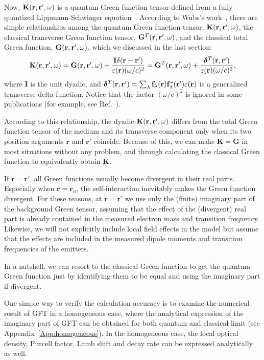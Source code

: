 Now, $\mathbf{K}(\mathbf{r},\mathbf{r}',\omega)$ is a quantum Green function tensor defined from a fully quantized Lippmann-Schwinger equation~\cite{Wubs2004}.
According to Wubs's work~\cite{Wubs2004}, there are simple relationships among the quantum Green function tensor, $\mathbf{K}(\mathbf{r},\mathbf{r}',\omega)$, the classical transverse Green function tensor, $\mathbf{G}^T(\mathbf{r},\mathbf{r}',\omega)$, and the classical total Green function, $\mathbf{G}(\mathbf{r},\mathbf{r}',\omega)$, which we discussed in the last section:
\begin{equation}
 \label{KG}
 \mathbf{K}(\mathbf{r},\mathbf{r}',\omega)=\mathbf{G}(\mathbf{r},\mathbf{r}',\omega)+\frac{\mathbf{I}\delta(\mathbf{r}-\mathbf{r}')}{\varepsilon(\mathbf{r})(\omega/c)^2}
=\mathbf{G}^T(\mathbf{r},\mathbf{r}',\omega)+\frac{\bm{\delta}^T(\mathbf{r},\mathbf{r}')}{\varepsilon(\mathbf{r})(\omega/c)^2},
\end{equation}
where $\mathbf{I}$ is the unit dyadic, and $\bm{\delta}^T(\mathbf{r},\mathbf{r}')
=\sum_\lambda{\mathbf{f}_{\lambda}(\mathbf{r})\mathbf{f}_{\lambda}^*(\mathbf{r}')}\varepsilon(\mathbf{r})$
is a generalized transverse delta function. Notice that the factor $(\omega/c)^2$ is ignored in some publications (for example, see Ref.~\cite{Yao2009a,Hughes2007}).

According to this relationship,  the dyadic $\mathbf{K}(\mathbf{r},\mathbf{r}',\omega)$ differs from the total Green function tensor of the medium and its transverse component only when its two position arguments $\mathbf{r}$ and $\mathbf{r}'$ coincide.
Because of this, we can make $\mathbf{K}=\mathbf{G}$ in most situations without any problem,
and through calculating the classical Green function to equivalently obtain $\mathbf{K}$.


If $\mathbf{r}=\mathbf{r}'$, all Green functions usually become divergent in their real parts.
Especially when $\mathbf{r}=\mathbf{r}_n$, the self-interaction inevitably makes the Green function divergent.
For these reasons, at $\mathbf{r}=\mathbf{r}'$ we use only the (finite) imaginary part of the background Green tensor, assuming that the effect of the (divergent) real part is already contained in the measured electron mass and transition frequency. Likewise, we will not explicitly include local field effects \cite{Martin1994} in the model but assume that
the effects are included in the measured dipole moments and transition frequencies of the emitters.

In a nutshell, we can resort to the classical Green function to get the quantum Green function just by identifying them
to be equal and using the imaginary part if divergent.

One simple way to verify the calculation accuracy is to examine the numerical result of GFT in a homogeneous case, where the analytical expression of the imaginary part of GFT can be obtained for both quantum and classical limit (see Appendix~\ref{App:homogeneous}). In the homogeneous case, the local optical density, Purcell factor, Lamb shift and decay rate can be expressed analytically as well.

